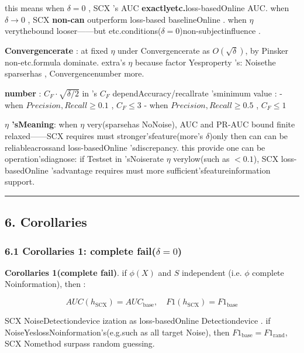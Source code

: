 \documentclass[
  12pt,
]{article}
\begin{document}
this means when  \(\delta = 0\) , SCX 's AUC \textbf{exactlyetc.}loss-basedOnline 
AUC. when  \(\delta \to 0\) , SCX \textbf{non-can }outperform loss-based baselineOnline . when  \(\eta\)
verythebound looser------but etc.conditions(\(\delta=0\))non-subjectinfluence . 

\textbf{Convergencerate }: at fixed  \(\eta\) under Convergencerate as  \(O(\sqrt{\delta})\), by 
Pinsker non-etc.formula dominate. extra's \(\eta\)
because factor Yesproperty 's: Noisethe sparserhas , Convergencenumber more. 

\textbf{number }: \(C_F \cdot \sqrt{\delta/2}\) in 's \(C_F\)
dependAccuracy/recallrate 'sminimum value :  - when  \(Precision, Recall \geq 0.1\)
, \(C_F \leq 3\) - when  \(Precision, Recall \geq 0.5\)
, \(C_F \leq 1\)

\textbf{\(\eta\) 'sMeaning}: when  \(\eta\) very(sparsehas NoNoise), AUC and 
PR-AUC bound finite relaxed------SCX requires must stronger'sfeature(more's
\(\delta\))only then can can be reliableacrossand loss-basedOnline 'sdiscrepancy. this provide one can be operation'sdiagnose: if Testset in 'sNoiserate 
\(\eta\) verylow(such as  \(<0.1\)), SCX
loss-basedOnline 'sadvantage requires must more sufficient'sfeatureinformation support. 

\begin{center}\rule{0.5\linewidth}{0.5pt}\end{center}

\subsection{6. Corollaries}\label{ux63a8ux8bba}

\subsubsection{\texorpdfstring{6.1 Corollaries
1: complete fail(\(\delta = 0\))}{6.1 Corollaries 1: complete fail(\textbackslash delta = 0)}}\label{ux63a8ux8bba-1ux5b8cux5168ux5931ux6548delta-0}

\textbf{Corollaries 1(complete fail)}. if  \(\phi(X)\) and  \(S\) independent (i.e. \(\phi\)
complete Noinformation), then : 

\[AUC(h_{\text{SCX}}) = AUC_{\text{base}}, \quad F1(h_{\text{SCX}}) = F1_{\text{base}}\]

SCX
NoiseDetectiondevice ization as loss-basedOnline Detectiondevice . if NoiseYeslossNoinformation's(e.g.such as all target Noise), then 
\(F1_{\text{base}} = F1_{\text{rand}}\), SCX Nomethod surpass random guessing. 
\end{document}
